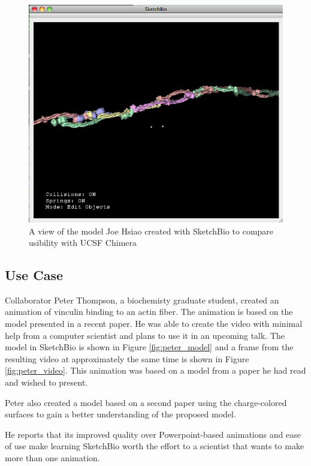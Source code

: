 \documentclass[twocolumn]{bmcart}%
\begin{document}
\begin{figure}[h]
\centering
\includegraphics[width=0.9\columnwidth]{joe_test.png}
\caption{A view of the model Joe Hsiao created with SketchBio to compare usibility with UCSF Chimera}
\label{fig:joe_test}
\end{figure}

\subsection*{Use Case}
Collaborator Peter Thompson, a biochemisty graduate student, created an animation of vinculin binding to an actin fiber.  The animation is based on the model presented in a recent paper.  He was able to create the video with minimal help from a computer scientist and plans to use it in an upcoming talk.  The model in SketchBio is shown in Figure \ref{fig:peter_model} and a frame from the resulting video at approximately the same time is shown in Figure \ref{fig:peter_video}.   This animation was based on a model from a paper he had read and wished to present.

Peter also created a model based on a second paper using the charge-colored surfaces to gain a better understanding of the proposed model.

He reports that its improved quality over Powerpoint-based animations and ease of use make learning SketchBio worth the effort to a scientist that wants to make more than one animation.
\end{document}
